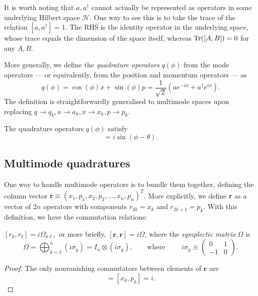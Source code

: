 \documentclass[a4paper]{report}
\newcommand{\bs}[1]{\boldsymbol{#1}}
\newcommand{\calH}{{\mathcal{H}}}
\begin{document}
It is worth noting that $a,a^\dagger$ cannot actually be represented as operators in some underlying Hilbert space $\calH$. One way to see this is to take the trace of the relation $[a,a^\dagger]=1$.
The RHS is the identity operator in the underlying space, whose trace equals the dimension of the space itself, whereas $\Tr([A,B])=0$ for any $A,B$.

\begin{defn}
	More generally, we define the \emph{quadrature operators} $q(\phi)$ from the mode operators --- or equivalently, from the position and momentum operators --- as
	\begin{equation}
		q(\phi) = \cos(\phi) x + \sin(\phi) p
		= \frac{1}{\sqrt2}(a e^{-i\phi} + a^\dagger e^{i\phi}).
	\end{equation}
	The definition is straightforwardly generalised to multimode spaces upon replacing $q\to q_k, a\to a_k, x\to x_k,p\to p_k$.
\end{defn}

\begin{prop}
	The quadrature operators $q(\phi)$ satisfy
	\begin{equation}
		[q(\theta), q(\phi)] = i \sin(\phi-\theta).
	\end{equation}
\end{prop}

\subsection{Multimode quadratures}

One way to handle multimode operators is to bundle them together, defining the column vector
$\bs r \equiv (x_1, p_1, x_2, p_2, ..., x_n, p_n)^T$.
More explicitly, we define $\bs r$ as a vector of $2n$ operators with components $r_{2k}=x_k$ and $r_{2k+1}=p_k$.
With this definition, we have the commutation relations:
\begin{prop}
	$[r_k, r_\ell] = i\Omega_{k\ell},$
	or more briefly, $[\bs r,\bs r] = i\Omega$,
	where the \emph{symplectic matrix} $\Omega$ is
	\begin{equation}
		\Omega = \bigoplus_{k=1}^{n} (i\sigma_y)
		= I_n \otimes (i\sigma_y),
		\qquad
		\text{where }
		\qquad
		i\sigma_y\equiv \begin{pmatrix}
			0 & 1\\-1& 0
		\end{pmatrix}.
	\end{equation}
\end{prop}
\begin{proof}
	The only nonvanishing commutators between elements of $\bs r$ are
	\begin{equation}
		[r_{2k}, r_{2k+1}] = [x_k, p_k] = i.
	\end{equation}
\end{proof}
\end{document}
